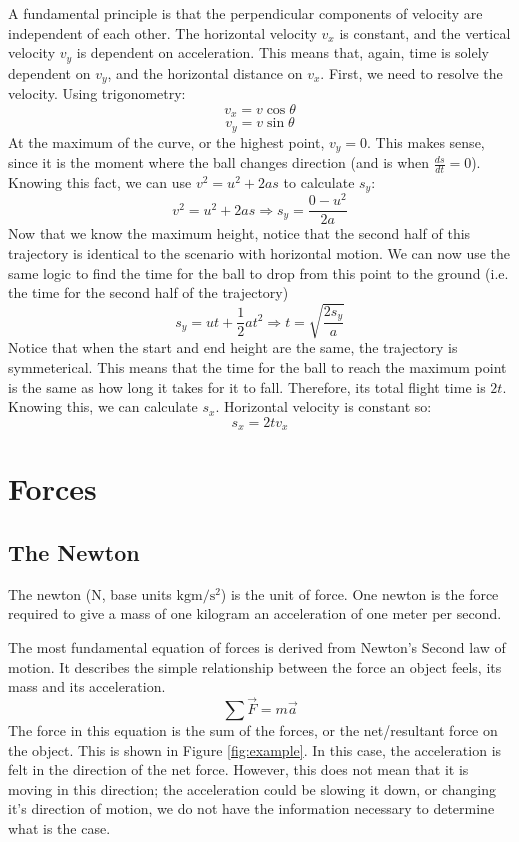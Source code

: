 A fundamental principle is that the perpendicular components of velocity are independent of each other. The horizontal velocity $v_{x}$ is constant, and the vertical velocity $v_{y}$ is dependent on acceleration. This means that, again, time is solely dependent on $v_{y}$, and the horizontal distance on $v_{x}$. First, we need to resolve the velocity. Using trigonometry:
\[v_{x}=v\cos\theta\]
\[v_{y}=v\sin\theta\]
At the maximum of the curve, or the highest point, $v_{y}=0$. This makes sense, since it is the moment where the ball changes direction (and is when $\frac{ds}{dt}=0$). Knowing this fact, we can use $v^{2}=u^{2}+2as$ to calculate $s_{y}$:
\[v^{2}=u^{2}+2as \Rightarrow s_{y}=\frac{0-u^{2}}{2a}\]
Now that we know the maximum height, notice that the second half of this trajectory is identical to the scenario with horizontal motion. We can now use the same logic to find the time for the ball to drop from this point to the ground (i.e. the time for the second half of the trajectory)
\[s_{y}=ut+\frac{1}{2}at^{2} \Rightarrow t=\sqrt{\frac{2s_{y}}{a}}\]
Notice that when the start and end height are the same, the trajectory is symmeterical. This means that the time for the ball to reach the maximum point is the same as how long it takes for it to fall. Therefore, its total flight time is $2t$. Knowing this, we can calculate $s_{x}$. Horizontal velocity is constant so:
\[s_{x}=2tv_{x}\]

\section{Forces}

\subsection{The Newton}

\begin{definition}
	The newton ($\si{\newton}$, base units $\si{\kilo\gram\meter\per\second\squared}$) is the unit of force. One newton is the force required to give a mass of one kilogram an acceleration of one meter per second.
\end{definition}

The most fundamental equation of forces is derived from Newton's Second law of motion. It describes the simple relationship between the force an object feels, its mass and its acceleration.
\begin{equation}
	\sum\vec{F} = m \vec{a}
	\label{eq:newton}
\end{equation}
The force in this equation is the sum of the forces, or the net/resultant force on the object. This is shown in Figure \ref{fig:example}. In this case, the acceleration is felt in the direction of the net force. However, this does not mean that it is moving in this direction; the acceleration could be slowing it down, or changing it's direction of motion, we do not have the information necessary to determine what is the case.  

